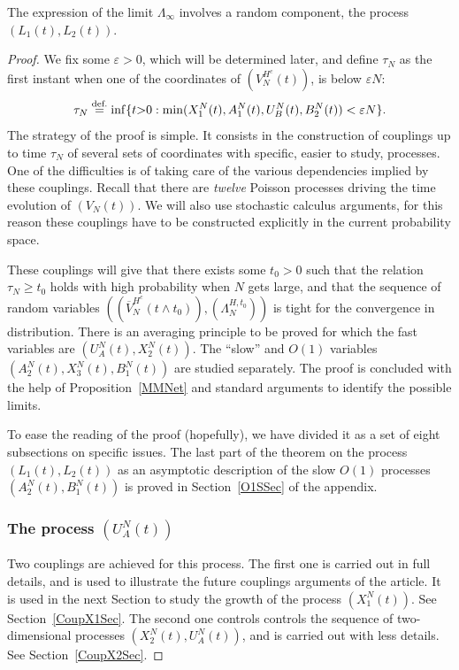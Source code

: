 \documentclass[english]{amsart}
\newcommand\steq[1]{\stackrel{\text{\rm #1.}}{=}}
\def\eps{\varepsilon}
\numberwithin{proposition}{section}
\begin{document}
The expression of the limit $\Lambda_\infty$ involves a random component, the process $(L_1(t),L_2(t))$.
\begin{proof}

We fix some $\eps{>}0$, which will be determined later, and define $\tau_N$ as the first instant when one of the coordinates of $(V_N^{H^c}(t))$,
is below $\eps N$: 
  \[
  \tau_N\steq{def}\inf\{t{>}0: \min(X_1^N(t),A_1^N(t),U_B^N(t),B_2^N(t))<\eps N\}.
  \]
The strategy of the proof is simple. It consists in the construction of couplings up to time $\tau_N$ of several sets of coordinates with specific, easier to study, processes. 
One of the difficulties is of taking care of the various dependencies implied by these couplings. Recall that there are {\em twelve} Poisson processes driving the time evolution of $(V_N(t))$. We will also use stochastic calculus arguments, for this reason these couplings have to be constructed explicitly in the current probability space.

These couplings will give that there exists some $t_0{>}0$ such that the relation $\tau_N{\ge}t_0$ holds with high probability when $N$ gets large, and that the sequence of  random variables $((\overline{V}_N^{H^c}(t{\wedge}t_0)),(\Lambda_N^{H,t_0}))$ is tight for the convergence in distribution. There is an averaging principle to be proved for which the fast variables are  $(U_A^N(t),X_2^N(t))$.
 The ``slow'' and $O(1)$ variables $(A_2^N(t),X_3^N(t),B_1^N(t))$ are studied separately.
The proof is concluded with the help of Proposition~\ref{MMNet}  and standard arguments to identify the possible limits.

To ease the reading of the proof (hopefully), we have divided it as a set of eight subsections on specific issues. The last part of the theorem on the process  $(L_1(t),L_2(t))$ as an asymptotic description of the slow $O(1)$ processes $(A_2^N(t),B_1^N(t))$ is proved in Section~\ref{O1SSec} of the appendix. 


\subsubsection{The process $(U_A^N(t))$}\label{CoupUASec}
Two couplings are achieved for this process. The first one is carried out in full details, and is used to illustrate the future couplings arguments of the article. It is used in the next Section to study the growth of the process $(X_1^N(t))$. See Section~\ref{CoupX1Sec}. The second one controls controls the sequence of two-dimensional processes $(X_2^N(t), U_A^N(t))$, and is carried out with less details. See Section~\ref{CoupX2Sec}.


\end{proof}
\end{document}
